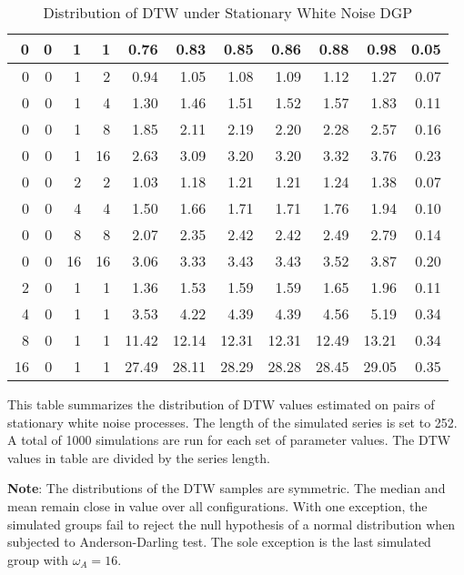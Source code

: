 \documentclass[12pt]{report}
\begin{document}
\begin{table}[!ht]
\begin{center}
\begin{tabular}{r r r r | r r r r r r r}
        0  & 0 & 1  & 1  & 0.76 & 0.83 & 0.85 & 0.86 & 0.88 & 0.98 & 0.05 \\
        \midrule
        0  & 0 & 1  & 2  & 0.94 & 1.05 & 1.08 & 1.09 & 1.12 & 1.27 & 0.07 \\
        0  & 0 & 1  & 4  & 1.30 & 1.46 & 1.51 & 1.52 & 1.57 & 1.83 & 0.11 \\
        0  & 0 & 1  & 8  & 1.85 & 2.11 & 2.19 & 2.20 & 2.28 & 2.57 & 0.16 \\
        0  & 0 & 1  & 16 & 2.63 & 3.09 & 3.20 & 3.20 & 3.32 & 3.76 & 0.23 \\
        \midrule
        0  & 0 & 2  & 2  & 1.03 & 1.18 & 1.21 & 1.21 & 1.24 & 1.38 & 0.07 \\
        0  & 0 & 4  & 4  & 1.50 & 1.66 & 1.71 & 1.71 & 1.76 & 1.94 & 0.10 \\
        0  & 0 & 8  & 8  & 2.07 & 2.35 & 2.42 & 2.42 & 2.49 & 2.79 & 0.14 \\
        0  & 0 & 16 & 16 & 3.06 & 3.33 & 3.43 & 3.43 & 3.52 & 3.87 & 0.20 \\
        \midrule
        2  & 0 & 1  & 1  &  1.36 &  1.53 &  1.59 &  1.59 &  1.65 &  1.96 & 0.11 \\
        4  & 0 & 1  & 1  &  3.53 &  4.22 &  4.39 &  4.39 &  4.56 &  5.19 & 0.34 \\
        8  & 0 & 1  & 1  & 11.42 & 12.14 & 12.31 & 12.31 & 12.49 & 13.21 & 0.34 \\
        16 & 0 & 1  & 1  & 27.49 & 28.11 & 28.29 & 28.28 & 28.45 & 29.05 & 0.35 \\
        \hline
      \end{tabular}
    \caption{Distribution of DTW under Stationary White Noise DGP} \label{tbl:dtw_white_noise}
    \end{center}
    \begin{tablenotes}
        \item{\footnotesize This table summarizes the distribution of DTW values estimated on pairs of stationary white noise processes. The length of the simulated series is set to 252. A total of 1000 simulations are run for each set of parameter values. The DTW values in table are divided by the series length.}
        \item{\footnotesize \textbf{Note}: The distributions of the DTW samples are symmetric. The median and mean remain close in value over all configurations. With one exception, the simulated groups fail to reject the null hypothesis of a normal distribution when subjected to Anderson-Darling test. The sole exception is the last simulated group with $\omega_{A}=16$.}

\end{tablenotes}
\end{table}
\end{document}
